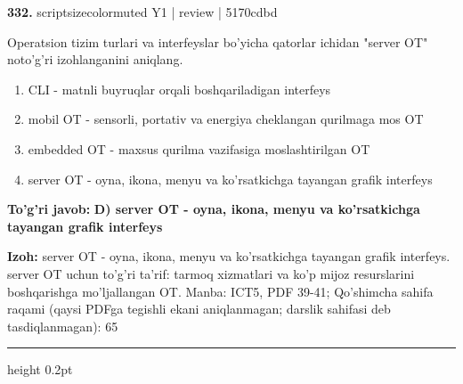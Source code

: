\documentclass[10pt,a4paper]{article}
\begin{document}
{\bfseries\sffamily\color{ink} 332.} {scriptsizecolor{muted} Y1 | review | 5170cdbd}
\par
Operatsion tizim turlari va interfeyslar bo'yicha qatorlar ichidan "server OT" noto'g'ri izohlanganini aniqlang.
\begin{enumerate}[label=\Alph*),leftmargin=9mm]
\item CLI - matnli buyruqlar orqali boshqariladigan interfeys
\item mobil OT - sensorli, portativ va energiya cheklangan qurilmaga mos OT
\item embedded OT - maxsus qurilma vazifasiga moslashtirilgan OT
\item server OT - oyna, ikona, menyu va ko'rsatkichga tayangan grafik interfeys
\end{enumerate}
\begin{tcolorbox}[enhanced,breakable,colback=teal!4,colframe=teal!60!black,boxrule=0.45pt,arc=1.2mm,left=2.7mm,right=2.7mm,top=1.8mm,bottom=1.8mm,before skip=2mm,after skip=2mm]
{\bfseries\sffamily\color{teal}To'g'ri javob:} \textbf{D) server OT - oyna, ikona, menyu va ko'rsatkichga tayangan grafik interfeys}
\par\smallskip
{\bfseries Izoh:} server OT - oyna, ikona, menyu va ko'rsatkichga tayangan grafik interfeys. server OT uchun to'g'ri ta'rif: tarmoq xizmatlari va ko'p mijoz resurslarini boshqarishga mo'ljallangan OT. Manba: ICT5, PDF 39-41; Qo'shimcha sahifa raqami (qaysi PDFga tegishli ekani aniqlanmagan; darslik sahifasi deb tasdiqlanmagan): 65
\end{tcolorbox}
\vspace{2mm}\hrule height 0.2pt\vspace{3mm}
\end{document}
